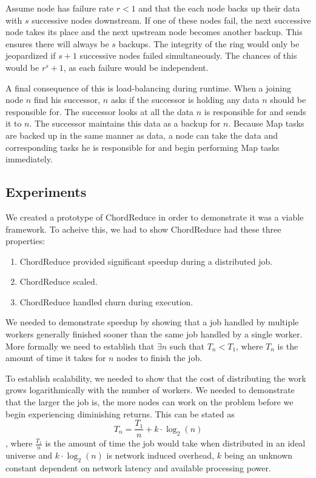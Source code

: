 Assume node has failure rate $r < 1$ and that the each node backs up their data with $s$ successive nodes downstream.
If one of these nodes fail, the next successive node takes its place and the next upstream node becomes another backup.
This ensures there will always be $s$ backups.
The integrity of the ring would only be jeopardized if $s+1$ successive nodes failed simultaneously.
The chances of this would be $r^s+1$, as each failure would be independent.


A final consequence of this is load-balancing during runtime.
When a joining node $n$ find his successor, $n$ asks if the successor is holding any data $n$ should be responsible for.
The successor looks at all the data $n$ is responsible for and sends it to $n$.
The successor maintains this data as a backup for $n$.
Because Map tasks are backed up in the same manner as data, a node can take the data and corresponding tasks he is responsible for and begin performing Map tasks immediately.

\subsection{Experiments}

We created a prototype of ChordReduce in order to demonstrate it was a viable framework.
To acheive this, we had to show ChordReduce had these three properties:
\begin{enumerate}
	\item ChordReduce provided significant speedup during a distributed job.
	\item ChordReduce scaled.
	\item ChordReduce handled churn during execution.
\end{enumerate}


We needed to demonstrate speedup by showing that a job handled by multiple workers generally finished sooner than the same job handled by a single worker.  
More formally we need to establish that $\exists n$ such that $T_{n} < T_{1}$, where $T_{n}$ is the amount of time it takes for $n$ nodes to finish the job.

To establish scalability, we needed to show that the cost of distributing the work grows logarithmically with the number of workers.  
We needed to demonstrate that the larger the job is, the more nodes can work on the problem before we begin experiencing diminishing returns. 
This can be stated as $$T_{n} = \frac{T_{1}}{n} + k \cdot \log_{2}(n)$$, where $\frac{T_{1}}{n}$ is the amount of time the job would take when distributed in an ideal universe and $k \cdot \log_{2}(n)$ is network induced overhead, $k$ being an unknown constant dependent on network latency and available processing power.

